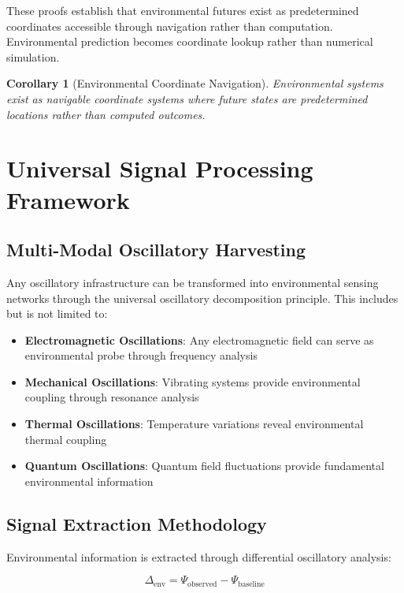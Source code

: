 \documentclass[12pt,a4paper]{article}
\newtheorem{corollary}{Corollary}
\begin{document}
These proofs establish that environmental futures exist as predetermined coordinates accessible through navigation rather than computation. Environmental prediction becomes coordinate lookup rather than numerical simulation.

\begin{corollary}[Environmental Coordinate Navigation]
Environmental systems exist as navigable coordinate systems where future states are predetermined locations rather than computed outcomes.
\end{corollary}

\section{Universal Signal Processing Framework}

\subsection{Multi-Modal Oscillatory Harvesting}

Any oscillatory infrastructure can be transformed into environmental sensing networks through the universal oscillatory decomposition principle. This includes but is not limited to:

\begin{itemize}
\item \textbf{Electromagnetic Oscillations}: Any electromagnetic field can serve as environmental probe through frequency analysis
\item \textbf{Mechanical Oscillations}: Vibrating systems provide environmental coupling through resonance analysis
\item \textbf{Thermal Oscillations}: Temperature variations reveal environmental thermal coupling
\item \textbf{Quantum Oscillations}: Quantum field fluctuations provide fundamental environmental information
\end{itemize}

\subsection{Signal Extraction Methodology}

Environmental information is extracted through differential oscillatory analysis:

\begin{equation}
\Delta_{\text{env}} = \Psi_{\text{observed}} - \Psi_{\text{baseline}}
\end{equation}
\end{document}
